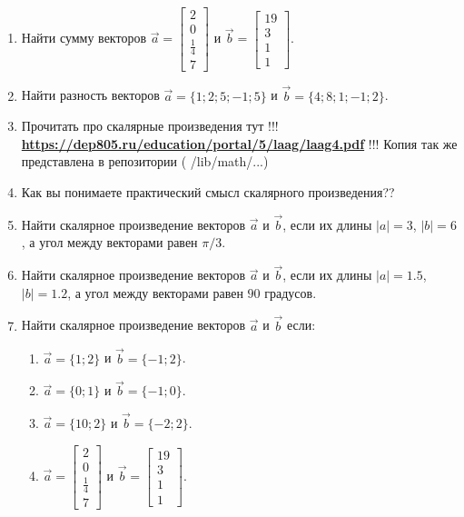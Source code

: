 \documentclass[a4paper,12pt]{article} %
\begin{document}
\begin{enumerate}
	\item Найти сумму векторов  $ \vec{a} = \begin{bmatrix}2\\ 0 \\ \frac{1}{4} \\ 7 \end{bmatrix} $ и $ \vec{b} = \begin{bmatrix}19\\ 3 \\ 1 \\1 \end{bmatrix}$. 


	\item Найти разность векторов $\vec{a} = \{1; 2; 5; -1; 5\}$ и $\vec{b} = \{4; 8; 1; -1; 2\}$. 

	


	\item Прочитать про скалярные произведения тут !!! \textbf{ \url{https://dep805.ru/education/portal/5/laag/laag4.pdf}} !!! Копия так же представлена в репозитории ( /lib/math/...)


	\item Как вы понимаете практический смысл скалярного произведения??




	\item Найти скалярное произведение векторов $\vec{a}$ и $\vec{b}$, если их длины $|a| = 3$, $|b| = 6$, а угол между векторами равен $ \pi / 3 $. 

	\item Найти скалярное произведение векторов $\vec{a}$ и $\vec{b}$, если их длины $|a| = 1.5$, $|b| = 1.2$, а угол между векторами равен $ 90 $ градусов. 

	\item Найти скалярное произведение векторов $\vec{a}$ и $\vec{b}$ если:

	 \begin{enumerate}

	 	\item $\vec{a} = \{1; 2\}$ и $\vec{b} = \{-1; 2\}$.

	 	\item $\vec{a} = \{0; 1\}$ и $\vec{b} = \{-1; 0\}$.

	 	\item $\vec{a} = \{10; 2\}$ и $\vec{b} = \{-2; 2\}$.

	 	\item $ \vec{a} = \begin{bmatrix}2\\ 0 \\ \frac{1}{4} \\ 7 \end{bmatrix} $ и $ \vec{b} = \begin{bmatrix}19\\ 3 \\ 1 \\1 \end{bmatrix}$. 


	 \end{enumerate} 
\end{enumerate}
\end{document}
